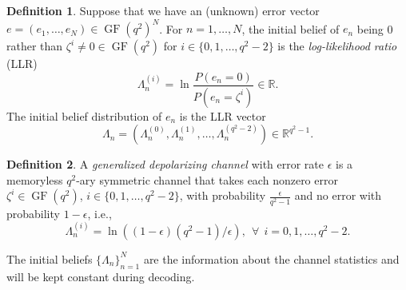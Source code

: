 \documentclass{ieeeaccess}
\DeclareMathOperator{\GF}{GF}
\newcommand{\RR}{{\mathbb R}}
\let\emph\textit
\theoremstyle{definition}		%
\newtheorem{definition}{Definition}
\begin{document}
\begin{definition} \label{def:LLR}
Suppose that we have an (unknown) error vector $e=(e_1,\dots,e_N)\in \GF(q^2)^N$.
	For  $n=1,\dots,N$, the initial belief  of  $e_n$ being 0 rather than  $\zeta^i\neq 0\in\GF(q^2)$ for $i\in\{0,1,\dots,q^2- {2}\}$ is the  \emph{log-likelihood ratio} (LLR)
	\begin{equation*}
	\Lambda_n^{(i)} = \ln\frac{P(e_n=0)}{P(e_n=\zeta^i)} \in \RR.
	\end{equation*}
	The initial belief distribution of $e_n$ is the LLR vector 
	\begin{equation*}
	\Lambda_n = (\Lambda_n^{( {0})}, \Lambda_n^{( {1})}, \dots, \Lambda_n^{(q^2- {2})}) \in\RR^{q^2-1}.
	\end{equation*}
\end{definition}



\begin{definition} \label{def:ch}
	A \emph{generalized depolarizing channel} with error rate $\epsilon$ is a memoryless $q^2$-ary symmetric channel that 
	takes each nonzero error $\zeta^i \in \GF(q^2)$, $i\in\{0,1,\dots,q^2-2\}$, with probability $\frac{\epsilon}{q^2-1}$ and no error with probability $1-\epsilon$, i.e.,
	\begin{equation*}
	\Lambda_n^{(i)} = \ln\left( (1-\epsilon)(q^2-1)/\epsilon \right), ~~\forall~~ i=0,1,\dots,q^2-2.
	\end{equation*}
\end{definition}

 The initial beliefs $\{\Lambda_n\}_{n=1}^N$ are the information about the channel statistics and will be kept constant during decoding.
\end{document}

